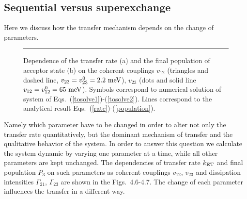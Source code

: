 \documentclass[12pt,twoside,a4paper]{report}
\begin{document}
\subsection{Sequential versus superexchange\label{chem-super}} 
Here we discuss
how the transfer mechanism depends on 
the change of parameters.
\footnotesize\begin{figure}[!h]\centering
  \parbox{5cm}
  {\rule{-3cm}{-3cm}
\epsfxsize=8.5cm}
\caption[Dependence of the transfer rate on the coherent couplings]
{\small 
\label{chem:vau-A}
Dependence of the transfer rate (a) and 
the final population
of acceptor state (b) 
on the coherent couplings
$v_{12}$ (triangles and dashed line, $v_{23}=v_{23}^0=2.2~ {\rm meV}$), 
$v_{23}$ (dots and solid line $v_{12}=v_{12}^0=65~{\rm meV}$).
Symbols correspond to numerical solution  
of system of Eqs.~(\ref{tosolve1})-(\ref{tosolve2}). 
Lines correspond to the analytical result Eqs.~(\ref{rate})-(\ref{population}). 
}
\end{figure}\normalsize
Namely which parameter have to be changed in order  
to alter not only the transfer rate quantitatively, but 
the dominant mechanism of transfer and 
the qualitative behavior of the system. 
In order to answer this question
we calculate the system dynamic 
by varying one parameter at a time,
while all other parameters are kept unchanged. 
The dependencies of transfer rate $k_{\rm ET}$ and final 
population
$P_3$ on such parameters as coherent couplings 
$v_{12}$, $v_{23}$ and dissipation intensities $\Gamma_{21}$, $\Gamma_{23}$ 
are shown in the Figs.~4.6-4.7.
The change of each parameter influences the transfer in a different way. 
 
\end{document}
